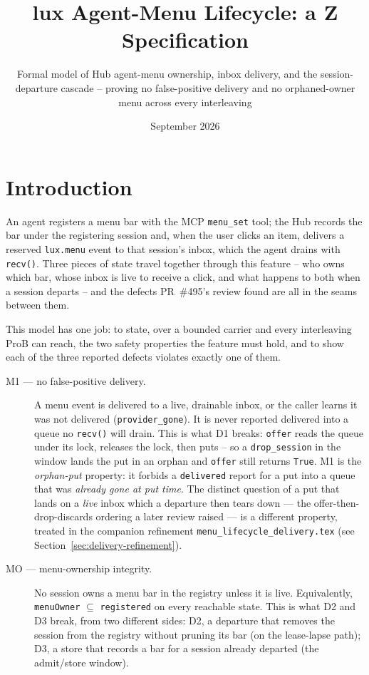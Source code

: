 \documentclass[a4paper,10pt,fleqn]{article}
\begin{document}
\title{lux Agent-Menu Lifecycle: a Z Specification}
\author{Formal model of Hub agent-menu ownership, inbox delivery, and the
  session-departure cascade -- proving no false-positive delivery and no
  orphaned-owner menu across every interleaving}
\date{September 2026}
\maketitle

\section{Introduction}

An agent registers a menu bar with the MCP \texttt{menu\_set} tool; the Hub
records the bar under the registering session and, when the user clicks an
item, delivers a reserved \texttt{lux.menu} event to that session's inbox,
which the agent drains with \texttt{recv()}. Three pieces of state travel
together through this feature -- who owns which bar, whose inbox is live to
receive a click, and what happens to both when a session departs -- and the
defects PR~\#495's review found are all in the seams between them.

This model has one job: to state, over a bounded carrier and every
interleaving ProB can reach, the two safety properties the feature must
hold, and to show each of the three reported defects violates exactly one
of them.

\begin{description}
  \item[M1 --- no false-positive delivery.] A menu event is delivered to a
    live, drainable inbox, or the caller learns it was not delivered
    (\texttt{provider\_gone}). It is never reported delivered into a queue no
    \texttt{recv()} will drain. This is what D1 breaks: \texttt{offer} reads
    the queue under its lock, releases the lock, then puts -- so a
    \texttt{drop\_session} in the window lands the put in an orphan and
    \texttt{offer} still returns \texttt{True}. M1 is the \emph{orphan-put}
    property: it forbids a \texttt{delivered} report for a put into a queue that
    was \emph{already gone at put time}. The distinct question of a put that
    lands on a \emph{live} inbox which a departure then tears down --- the
    offer-then-drop-discards ordering a later review raised --- is a different
    property, treated in the companion refinement
    \texttt{menu\_lifecycle\_delivery.tex} (see
    Section~\ref{sec:delivery-refinement}).
  \item[MO --- menu-ownership integrity.] No session owns a menu bar in the
    registry unless it is live. Equivalently, \texttt{menuOwner} $\subseteq$
    \texttt{registered} on every reachable state. This is what D2 and D3
    break, from two different sides: D2, a departure that removes the session
    from the registry without pruning its bar (on the lease-lapse path);
    D3, a store that records a bar for a session already departed (the
    admit/store window).
\end{description}
\end{document}
